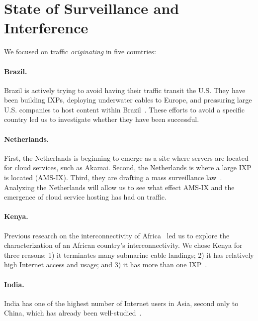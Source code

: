 \section{State of Surveillance and Interference}
\label{surv}

We focused on traffic {\em originating} in five countries:

\paragraph{Brazil.} Brazil is actively trying to avoid having their
traffic transit the U.S. They have been building IXPs,
deploying underwater cables to Europe, and pressuring large
U.S. companies to host content within Brazil~\cite{brazil_history,
  brazil_break_from_US, brazil_conference, 
  brazil_conference2, brazil_human_rights, brazil_cable,
  brazil_us_companies, brazil_IXP1}.  These efforts to avoid 
a specific country led us to investigate whether they
have been successful. 

\paragraph{Netherlands.}  First, the Netherlands is beginning to emerge
as a site where servers are located for cloud services, such as Akamai.
Second, the Netherlands is where a large IXP is located (AMS-IX). Third, they
are drafting a mass surveillance
law~\cite{netherlands_surveillance}. Analyzing the Netherlands will
allow us to see what effect AMS-IX and the emergence of cloud service
hosting has had on traffic. 

\paragraph{Kenya.} Previous research on the interconnectivity of
Africa~\cite{gupta2014peering, fanou2015diversity} led us to explore the
characterization of an African country's interconnectivity.  We chose
Kenya for three reasons: 1) it terminates many submarine cable landings;
2) it has relatively high Internet access and usage; and 3) it has more
than one IXP~\cite{kenya_nigeria, teams}. 

\paragraph{India.}  India has one of the highest number of Internet
users in Asia, second only to China, which has already been
well-studied~\cite{tsui2003panopticon, wang2010discourse}.  

